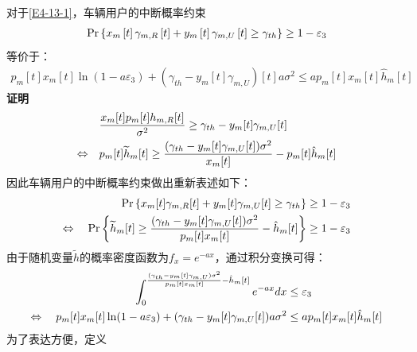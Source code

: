 对于\eqref{E4-13-1}，车辆用户的中断概率约束
\begin{align}
\Pr\left\{x_m\left[t\right]\gamma_{m,R}\left[t\right]+y_m\left[t\right]\gamma_{m,U}\left[t\right] \geq \gamma_{th}\right\}\geq1-\varepsilon_3    \notag
\end{align}
等价于：
\begin{equation} \label{E4-14}
\begin{gathered}
p_m\left[t\right]x_m\left[t\right]\ln \left(1-a \varepsilon_3\right)+(\gamma_{th}-y_m\left[t\right]\gamma_{m,U})\left[t\right] a \sigma^2
\leq a p_m\left[t\right]x_m\left[t\right]\hat{h}_{m}\left[t\right]
\end{gathered}
\end{equation}
\textbf{证明}
\begin{align} \label{E4-15}
\qquad & \frac{x_m[t]p_m[t]h_{m,R}[t]}{\sigma^2} \geq \gamma_{th} - y_m[t]\gamma_{m,U}[t] \\
\Leftrightarrow \quad
& p_m[t]{\widetilde{h}}_{m}[t] \geq \frac{(\gamma_{th} - y_m[t]\gamma_{m,U}[t])\sigma^2}{x_m[t]} - p_m[t]{\hat{h}}_{m}[t] \notag
\end{align}
因此车辆用户的中断概率约束做出重新表述如下：
\begin{align} \label{E4-16}
\Pr\left\{ x_m[t]\gamma_{m,R}[t] + y_m[t]\gamma_{m,U}[t] \geq \gamma_{th} \right\} &\geq 1 - \varepsilon_3 \\
\Leftrightarrow \quad
\Pr\left\{ {\widetilde{h}}_{m}[t] \geq \frac{(\gamma_{th} - y_m[t]\gamma_{m,U}[t])\sigma^2}{p_m[t]x_m[t]} - {\hat{h}}_{m}[t] \right\} &\geq 1 - \varepsilon_3 \notag
\end{align}
由于随机变量$\widetilde{h}$的概率密度函数为$f_x={{e}^{-ax}}$，通过积分变换可得：
\begin{align} \label{E4-17}
\int_{0}^{\frac{(\gamma_{th}-y_m[t]\gamma_{m,U})\sigma^2}{p_m[t]x_m[t]} - \hat{h}_{m}[t]}{e^{-ax}dx} &\leq \varepsilon_3  \\
\Leftrightarrow \quad
p_m[t]x_m[t]\ln(1-a\varepsilon_3) + (\gamma_{th}-y_m[t]\gamma_{m,U}[t])a\sigma^2 &\leq a p_m[t]x_m[t]\hat{h}_{m}[t] \notag
\end{align}
为了表达方便，定义
